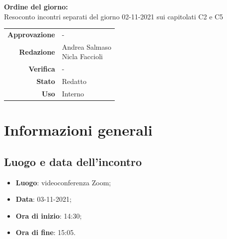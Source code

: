 \documentclass[11pt]{article}
\begin{document}
\begin{titlepage}
\begin{center}
			\large
			
			\vfill
			\textbf{Ordine del giorno:} \\
			Resoconto incontri separati del giorno 02-11-2021 sui capitolati C2 e C5
			
			
			\vfill
			
			
			\begin{tabular}{r|l}
				\textbf{Approvazione} &  -\\
				\textbf{Redazione} &  \parbox[t]{5cm}{Andrea Salmaso \\Nicla Faccioli}\\
				\textbf{Verifica} &  -\\
				\textbf{Stato} & Redatto \\
				\textbf{Uso} & Interno
			\end{tabular}
			\vfill
			
		\end{center}
	\end{titlepage}

	\section{Informazioni generali}
	\subsection{Luogo e data dell'incontro}
	\begin{itemize}
		\item \textbf{Luogo}: videoconferenza Zoom;
		\item \textbf{Data}: 03-11-2021;
		\item \textbf{Ora di inizio}: 14:30;
		\item \textbf{Ora di fine}: 15:05.
	\end{itemize}
	
\end{document}
